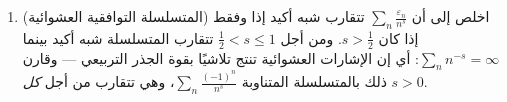 \begin{problem}
\begin{enumerate}[resume]
{        كوشي--شوارتز على القطعة العليا)}.
        (b) برهن على $\E T_n^4 \leq 3s_n^4$.
        (c) استنتج $\P\bigl(\abs{T_n} > \frac{s_n}2\bigr)
        \geq \frac3{16}$ واخلص إلى أن $\sum_nx_n\varepsilon_n$ تتباعد شبه
        أكيد؛ ومن ثَمّ الثنائية
        \[
        \sum_nx_n\varepsilon_n\ \text{ يتقارب شبه أكيد}
        \iff \sum_nx_n^2 < \infty .
        \]
  \item (المتسلسلة التوافقية العشوائية) اخلص إلى أن $\sum_n\frac{\varepsilon_n}{n^s}$
        تتقارب شبه أكيد إذا وفقط إذا كان $s > \frac12$. ومن
        أجل $\frac12 < s \leq
        1$ تتقارب المتسلسلة شبه أكيد بينما $\sum_nn^{-s} = \infty$:
        أي إن الإشارات العشوائية تنتج تلاشيًا بقوة الجذر
        التربيعي --- وقارن ذلك بالمتسلسلة المتناوبة $\sum_n\frac{(-1)^n}{n^s}$،
        وهي تتقارب من أجل \emph{كل} $s > 0$.
\end{enumerate}


\end{problem}
